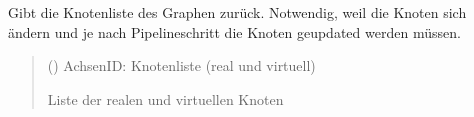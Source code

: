 \documentclass[a4paper,10pt,ngerman]{sphinxmanual}
\begin{document}
\begin{fulllineitems}
\begin{fulllineitems}
\label{\detokenize{api:src.hiveplot.HivePlotLayout.strict_intra_nodes_by_axis}}
\pysigstartsignatures
\pysigline
{}
\pysigstopsignatures
\end{fulllineitems}


\begin{fulllineitems}
\label{\detokenize{api:src.hiveplot.HivePlotLayout.updated_nodes}}
\pysigstartsignatures
\pysiglinewithargsret
{}
{}
{}
\pysigstopsignatures
\sphinxAtStartPar
Gibt die Knotenliste des Graphen zurück. Notwendig, weil die Knoten sich ändern und je nach Pipelineschritt die Knoten geupdated werden müssen.
\begin{quote}\begin{description}
\sphinxAtStartPar
{} (\sphinxstyleliteralemphasis{\sphinxupquote{{[}}}\sphinxstyleliteralemphasis{\sphinxupquote{, }}\sphinxstyleliteralemphasis{\sphinxupquote{{[}}}\sphinxstyleliteralemphasis{\sphinxupquote{ | }}\sphinxstyleliteralemphasis{\sphinxupquote{{]}}}\sphinxstyleliteralemphasis{\sphinxupquote{{]}}}) \textendash{} AchsenID: Knotenliste (real und virtuell)

\sphinxAtStartPar
Liste der realen und virtuellen Knoten

\sphinxAtStartPar
{}

\end{description}\end{quote}

\end{fulllineitems}


\end{fulllineitems}
\end{document}
